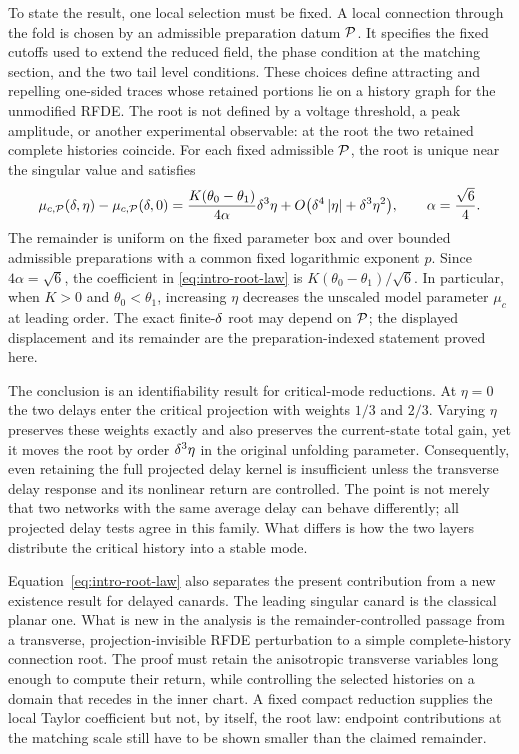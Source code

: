 To state the result, one local selection must be fixed.  A local
connection through the fold is chosen by an admissible preparation datum
\(\mathcal P\).  It specifies the fixed cutoffs used to extend the reduced field,
the phase condition at the matching section, and the two tail level
conditions.  These choices define attracting and repelling one-sided traces
whose retained portions lie on a history graph for the unmodified RFDE.  The root is
not defined by a voltage threshold, a peak amplitude, or another
experimental observable: at the root the two retained complete histories
coincide.  For each fixed admissible \(\mathcal P\), the root is unique near the
singular value and satisfies
\begin{equation}
 \label{eq:intro-root-law}
 \mu_{c,\mathcal P}(\delta,\eta)-\mu_{c,\mathcal P}(\delta,0)
 =\frac{K(\theta_0-\theta_1)}{4\alpha}\delta^3\eta
  +O\bigl(\delta^4\left\lvert \eta\right\rvert+\delta^3\eta^2\bigr),
 \qquad
 \alpha=\frac{\sqrt6}{4}.
\end{equation}
The remainder is uniform on the fixed parameter box and over bounded
admissible preparations with a common fixed logarithmic exponent \(p\).
Since \(4\alpha=\sqrt6\), the coefficient in
\eqref{eq:intro-root-law} is
\(K(\theta_0-\theta_1)/\sqrt6\).  In particular, when \(K>0\) and
\(\theta_0<\theta_1\), increasing \(\eta\) decreases the unscaled model
parameter \(\mu_c\) at leading order.  The exact finite-\(\delta\) root may
depend on \(\mathcal P\); the displayed displacement and its remainder are the
preparation-indexed statement proved here.

The conclusion is an identifiability result for critical-mode reductions.
At \(\eta=0\) the two delays enter the critical projection with weights
\(1/3\) and \(2/3\).  Varying \(\eta\) preserves these weights exactly and
also preserves the current-state total gain, yet it moves the root by order
\(\delta^3\eta\) in the original unfolding parameter.  Consequently, even
retaining the full projected delay kernel is insufficient unless the
transverse delay response and its nonlinear return are controlled.  The
point is not merely that two networks with the same average delay can behave
differently; all projected delay tests agree in this family.  What differs
is how the two layers distribute the critical history into a stable mode.

Equation~\eqref{eq:intro-root-law} also separates the present contribution
from a new existence result for delayed canards.  The leading singular
canard is the classical planar one.  What is new in the analysis is the
remainder-controlled passage from a transverse, projection-invisible RFDE
perturbation to a simple complete-history connection root.  The proof must
retain the anisotropic transverse variables long enough to compute their
return, while controlling the selected histories on a domain that recedes
in the inner chart.  A fixed compact reduction supplies the local Taylor
coefficient but not, by itself, the root law: endpoint contributions at the
matching scale still have to be shown smaller than the claimed remainder.

